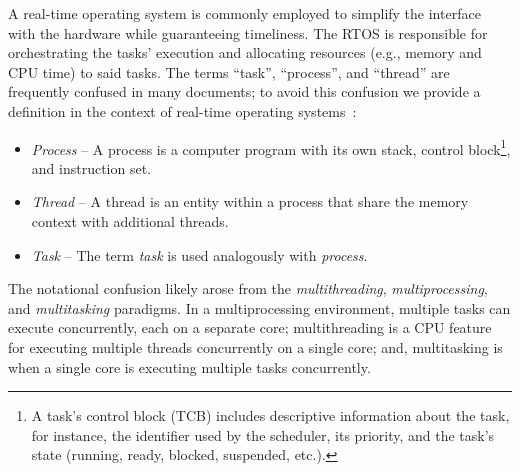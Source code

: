 A real-time operating system is commonly employed to simplify the interface with the hardware while guaranteeing timeliness.
The RTOS is responsible for orchestrating the tasks' execution and allocating resources (e.g., memory and CPU time) to said tasks.
The terms ``task'', ``process'', and ``thread'' are frequently confused in many documents; to avoid this confusion we provide a definition in the context of real-time operating systems~\addref{}:
%
\begin{itemize}
    \item \emph{Process} -- A process is a computer program with its own stack, control block\footnote{A task's control block (TCB) includes descriptive information about the task, for instance, the identifier used by the scheduler, its priority, and the task's state (running, ready, blocked, suspended, etc.).}, and instruction set.

    \item \emph{Thread} -- A thread is an entity within a process that share the memory context with additional threads.

    \item \emph{Task} -- The term \emph{task} is used analogously with \emph{process}.
\end{itemize}
%
The notational confusion likely arose from the \emph{multithreading}, \emph{multiprocessing}, and \emph{multitasking} paradigms.
In a multiprocessing environment, multiple tasks can execute concurrently, each on a separate core; multithreading is a CPU feature for executing multiple threads concurrently on a single core; and, multitasking is when a single core is executing multiple tasks concurrently.

